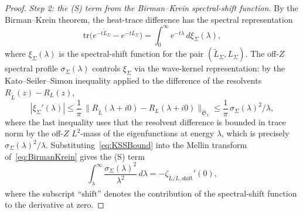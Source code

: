 \begin{proof}
\smallskip
\emph{Step 2: the (S) term from the Birman--Krein spectral-shift function.}
By the Birman--Krein theorem, the heat-trace difference has the spectral representation
\begin{equation}\label{eq:BirmanKrein}
    \mathrm{tr}\bigl(e^{-t\tilde L_\Sigma}-e^{-tL_\Sigma}\bigr)
    =
    \int_0^\infty e^{-t\lambda}\,d\xi_\Sigma(\lambda),
\end{equation}
where $\xi_\Sigma(\lambda)$ is the spectral-shift function for the pair $(\tilde L_\Sigma,L_\Sigma)$. The off-$Z$ spectral profile $\sigma_\Sigma(\lambda)$ controls $\xi_\Sigma$ via the wave-kernel representation: by the Kato--Seiler--Simon inequality applied to the difference of the resolvents $R_{\tilde L}(z)-R_L(z)$,
\begin{equation}\label{eq:KSSBound}
    |\xi_\Sigma'(\lambda)|
    \le
    \frac{1}{\pi}\,\|R_{\tilde L}(\lambda+i0)-R_L(\lambda+i0)\|_{\mathfrak S_1}
    \le
    \frac{1}{\pi}\,\sigma_\Sigma(\lambda)^2/\lambda,
\end{equation}
where the last inequality uses that the resolvent difference is bounded in trace norm by the off-$Z$ $L^2$-mass of the eigenfunctions at energy $\lambda$, which is precisely $\sigma_\Sigma(\lambda)^2/\lambda$. Substituting~\eqref{eq:KSSBound} into the Mellin transform of~\eqref{eq:BirmanKrein} gives the (S) term
\begin{equation}\label{eq:STermDerivation}
    \int_{\underline\lambda}^\infty \frac{\sigma_\Sigma(\lambda)^2}{\lambda^2}\,d\lambda
    =
    -\zeta_{\tilde L/L,\mathrm{shift}}'(0),
\end{equation}
where the subscript ``$\mathrm{shift}$'' denotes the contribution of the spectral-shift function to the derivative at zero.


\end{proof}
